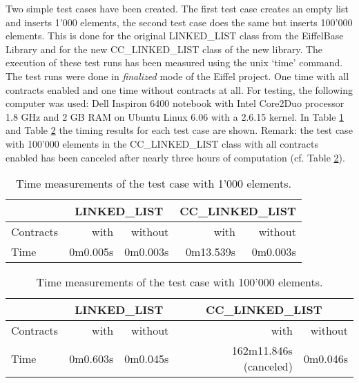 Two simple test cases have been created. The first test case creates an empty list and inserts 1'000 elements, the second test case does the same but inserts 100'000 elements. This is done for the original LINKED\_LIST class from the EiffelBase Library and for the new CC\_LINKED\_LIST class of the new library. The execution of these test runs has been measured using the unix `time' command. The test runs were done in \emph{finalized} mode of the Eiffel project. One time with all contracts enabled and one time without contracts at all. For testing, the following computer was used: Dell Inspiron 6400 notebook with Intel Core2Duo processor 1.8 GHz and 2 GB RAM on Ubuntu Linux 6.06 with a 2.6.15 kernel. In Table \ref{tab:TimeMeasurements1} and Table \ref{tab:TimeMeasurements2} the timing results for each test case are shown. Remark: the test case with 100'000 elements in the CC\_LINKED\_LIST class with all contracts enabled has been canceled after nearly three hours of computation (cf. Table \ref{tab:TimeMeasurements2}).

\begin{table}
	\caption{Time measurements of the test case with 1'000 elements.}
	\centering
	\begin{tabular}{|l|rr|rr|}
		\hline
		& \multicolumn{2}{|c|}{LINKED\_LIST} & \multicolumn{2}{|c|}{CC\_LINKED\_LIST} \\
		\hline
		Contracts & with & without & with & without \\
		Time & 0m0.005s & 0m0.003s & 0m13.539s & 0m0.003s \\
		\hline
	\end{tabular}
	\label{tab:TimeMeasurements1}
\end{table}

\begin{table}
	\caption{Time measurements of the test case with 100'000 elements.}
	\centering
	\begin{tabular}{|l|rr|rr|}
		\hline
		& \multicolumn{2}{|c|}{LINKED\_LIST} & \multicolumn{2}{|c|}{CC\_LINKED\_LIST} \\
		\hline
		Contracts & with & without & with & without \\
		Time & 0m0.603s & 0m0.045s & 162m11.846s (canceled) & 0m0.046s \\
		\hline
	\end{tabular}
	\label{tab:TimeMeasurements2}
\end{table}

